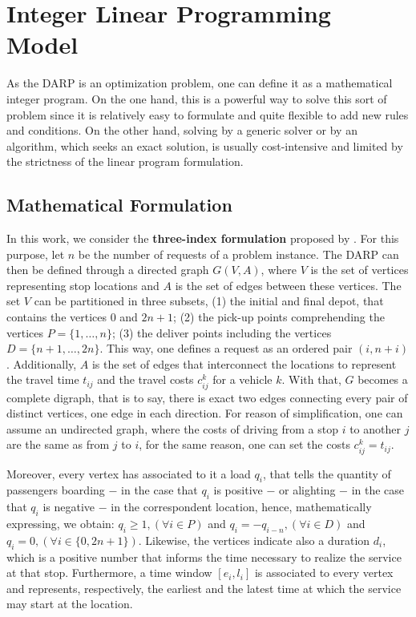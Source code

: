 \documentclass[tuberlin,cic,tc,openright,english,noabntcite,oneside]{iiufrgs}
\begin{document}
\section{Integer Linear Programming Model}\label{sec:integer-programming}
As the DARP is an optimization problem, one can define it as a mathematical integer program. On the one hand, this is a powerful way to solve this sort of problem since it is relatively easy to formulate and quite flexible to add new rules and conditions. On the other hand, solving by a generic solver or by an algorithm, which seeks an exact solution, is usually cost-intensive and limited by the strictness of the linear program formulation.

\subsection{Mathematical Formulation}
In this work, we consider the \textbf{three-index formulation} proposed by \textcite[p. 574-575]{cordeau_branch-and-cut_2006}. For this purpose, let $n$ be the number of requests of a problem instance. The DARP can then be defined through a directed graph $G(V,A)$, where $V$ is the set of vertices representing stop locations and $A$ is the set of edges between these vertices. The set $V$ can be partitioned in three subsets, (1) the initial and final depot, that contains the vertices $0$ and $2n+1$; (2) the pick-up points comprehending the vertices $P=\{1,\dotsc,n\}$; (3) the deliver points including the vertices $D=\{n+1,\dotsc,2n\}$. This way, one defines a request as an ordered pair $(i,n+i)$. Additionally, $A$ is the set of edges that interconnect the locations to represent the travel time $t_{ij}$ and the travel costs $c_{ij}^{k}$ for a vehicle $k$. With that, $G$ becomes a complete digraph, that is to say, there is exact two edges connecting every pair of distinct vertices, one edge in each direction. For reason of simplification, one can assume an undirected graph, where the costs of driving from a stop $i$ to another $j$ are the same as from $j$ to $i$, for the same reason, one can set the costs $c_{ij}^{k} = t_{ij}$.

Moreover, every vertex has associated to it a load $q_{i}$, that tells the quantity of passengers boarding $-$ in the case that $q_{i}$ is positive $-$ or alighting $-$ in the case that $q_{i}$ is negative $-$ in the correspondent location, hence, mathematically expressing, we obtain: $q_{i}\geq 1, (\forall i \in P)$ and $q_{i} = -q_{i-n}, (\forall i \in D)$ and $q_{i} = 0, (\forall i \in \{0,2n+1\})$. Likewise, the vertices indicate also a duration $d_i$, which is a positive number that informs the time necessary to realize the service at that stop. Furthermore, a time window $[e_{i}, l_{i}]$ is associated to every vertex and represents, respectively, the earliest and the latest time at which the service may start at the location.
\end{document}
